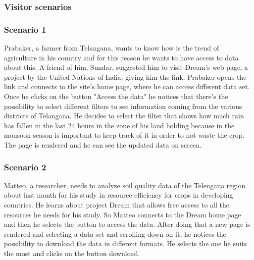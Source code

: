 \subsubsection{Visitor scenarios}
\subsubsection*{Scenario 1}
Prabaker, a farmer from Telangana, wants to know how is the trend of agriculture in his country and for this reason he wants to have access to data about this. A friend of him, Sundar, suggested him to visit Dream’s web page, a project by the United Nations of India, giving him the link. Prabaker opens the link and connects to the site’s home page, where he can access different data set. Once he clicks on the button "Access the data" he notices that there’s the possibility to select different filters to see information coming from the various districts of Telangana. He decides to select the filter that shows how much rain has fallen in the last 24 hours in the zone of his land holding because in the monsoon season is important to keep track of it in order to not waste the crop. The page is rendered and he can see the updated data on screen.

\subsubsection*{Scenario 2}
Matteo, a researcher, needs to analyze soil quality data of the Telengana region about last month for his study in resource efficiency for crops in developing countries. He learns about project Dream that allows free access to all the resources he needs for his study. So Matteo connects to the Dream home page and then he selects the button to access the data. After doing that a new page is rendered and selecting a data set and scrolling down on it, he notices the possibility to download the data in different formats. He selects the one he suits the most and clicks on the button download.
\newpage

